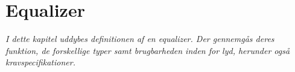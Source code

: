 \chapter{Equalizer}\label{kap:equalizer}

\emph{I dette kapitel uddybes definitionen af en equalizer. Der gennemgås deres funktion, de forskellige typer samt brugbarheden inden for lyd, herunder også kravspecifikationer.}